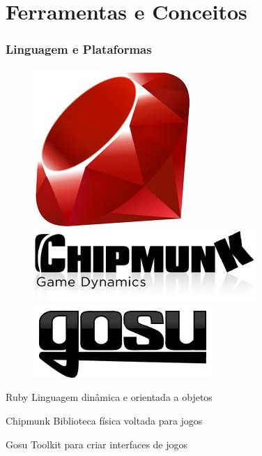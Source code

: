 \documentclass{beamer}
\begin{document}
\section{Ferramentas e Conceitos}
\begin{frame}
  \frametitle{Linguagem e Plataformas}
  \begin{figure}
    \includegraphics[scale=0.2]{ruby.jpg}
    \hspace{0.5cm}
    \includegraphics[scale=0.4]{chipmunk.jpg}
    \hspace{0.5cm}
    \includegraphics[scale=0.3]{gosu.jpg}
  \end{figure}
  \begin{block}{Ruby}
    Linguagem dinâmica e orientada a objetos
  \end{block}
  \begin{block}{Chipmunk}
    Biblioteca física voltada para jogos
  \end{block}
  \begin{block}{Gosu}
    Toolkit para criar interfaces de jogos
  \end{block}
\end{frame}
\end{document}
